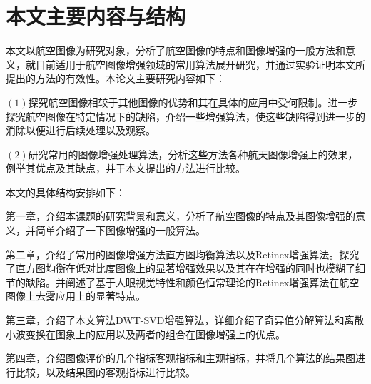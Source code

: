 \section{本文主要内容与结构}本文以航空图像为研究对象，分析了航空图像的特点和图像增强的一般方法和意义，就目前适用于航空图像增强领域的常用算法展开研究，并通过实验证明本文所提出的方法的有效性。本论文主要研究内容如下：

$(1)$探究航空图像相较于其他图像的优势和其在具体的应用中受何限制。进一步探究航空图像在特定情况下的缺陷，介绍一些增强算法，使这些缺陷得到进一步的消除以便进行后续处理以及观察。

$(2)$研究常用的图像增强处理算法，分析这些方法各种航天图像增强上的效果，例举其优点及其缺点，并于本文提出的方法进行比较。

本文的具体结构安排如下：

第一章，介绍本课题的研究背景和意义，分析了航空图像的特点及其图像增强的意义，并简单介绍了一下图像增强的一般算法。

第二章，介绍了常用的图像增强方法直方图均衡算法以及Retinex增强算法。探究了直方图均衡在低对比度图像上的显著增强效果以及其在在增强的同时也模糊了细节的缺陷。并阐述了基于人眼视觉特性和颜色恒常理论的Retinex增强算法在航空图像上去雾应用上的显著特点。

第三章，介绍了本文算法DWT-SVD增强算法，详细介绍了奇异值分解算法和离散小波变换在图象上的应用以及两者的组合在图像增强上的优点。

第四章，介绍图像评价的几个指标客观指标和主观指标，并将几个算法的结果图进行比较，以及结果图的客观指标进行比较。


